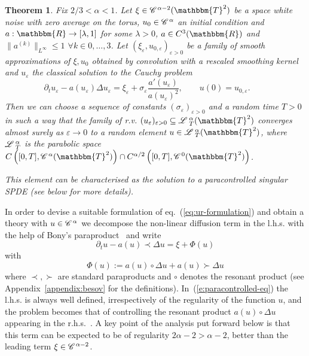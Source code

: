 \documentclass{amsart}
\newcommand{\assign}{:=}
\newtheorem{theorem}{Theorem}
\theoremstyle{remark}
\theoremstyle{definition}
\newcommand{\CC}{\mathscr{C} \hspace{.1em}}
\newcommand{\LL}{\mathscr{L} \hspace{.2em}}
\begin{document}
\begin{theorem}
  Fix $2 / 3 < \alpha < 1$. Let $\xi \in \CC^{\alpha - 2} (\mathbbm{T}^2)$ be
  a space white noise with zero average on the torus, $u_0 \in \CC^{\alpha}$
  an initial condition and $a : \mathbbm{R} \rightarrow [\lambda, 1]$ for some
  $\lambda > 0$, $a \in C^3 (\mathbbm{R})$ and $\| a^{(k)} \|_{L^{\infty}}
  \leqslant 1$ $\forall k \in 0, \ldots, 3$. Let $(\xi_{\varepsilon}, u_{0,
  \varepsilon})_{\varepsilon > 0}$ be a family of smooth approximations of
  $\xi, u_0$ obtained by convolution with a rescaled smoothing kernel and
  $u_{\varepsilon}$ the classical solution to the Cauchy problem
  \begin{equation}
    \partial_t u_{\varepsilon} - a (u_{\varepsilon}) \Delta u_{\varepsilon} =
    \xi_{\varepsilon} + \sigma_{\varepsilon} \frac{a' (u_{\varepsilon})}{a
    (u_{\varepsilon})^2}, \qquad u (0) = u_{0, \varepsilon} . \qquad
    \label{eq:ur-formulation-approx}
  \end{equation}
  Then we can choose a sequence of constants
  $(\sigma_{\varepsilon})_{\varepsilon > 0}$ and a random time $T > 0$ in such
  a way that the family of r.v. $(u_{\varepsilon})_{\varepsilon > 0} \subseteq
  \LL_T^{\alpha} (\mathbbm{T}^2)$ converges almost surely as $\varepsilon
  \rightarrow 0$ to a random element $u \in \LL_T^{\alpha} (\mathbbm{T}^2)$,
  where $\LL_T^{\alpha}$ is the parabolic space $C \left( [0, T], \CC^{\alpha}
  (\mathbbm{T}^2) \right) \cap C^{\alpha / 2} \left( [0, T], \CC^0
  (\mathbbm{T}^2) \right)$.
  
  This element can be characterised as the solution to a paracontrolled
  singular SPDE (see below for more details).
\end{theorem}

In order to devise a suitable formulation of eq.~(\ref{eq:ur-formulation}) and
obtain a theory with $u \in \CC^{\alpha}$ we decompose the non-linear
diffusion term in the l.h.s. with the help of Bony's
paraproduct~{\cite{meyer_remarques_1981}} and write
\begin{equation}
  \partial_t u - a (u) \prec \Delta u = \xi + \Phi (u)
  \label{e:paracontrolled-eq}
\end{equation}
with
\begin{equation}
  \Phi (u) \assign a (u) \circ \Delta u + a (u) \succ \Delta u
  \label{e:def-Phi}
\end{equation}
where $\prec, \succ$ are standard paraproducts and $\circ$ denotes the
resonant product (see Appendix~\ref{appendix:besov} for the definitions).
In~(\ref{e:paracontrolled-eq}) the l.h.s. is always well defined,
irrespectively of the regularity of the function $u$, and the problem becomes
that of controlling the resonant product $a (u) \circ \Delta u$ appearing in
the r.h.s.~. A key point of the analysis put forward below is that this term
can be expected to be of regularity $2 \alpha - 2 > \alpha - 2$, better than
the leading term $\xi \in \CC^{\alpha - 2}$.
\end{document}
